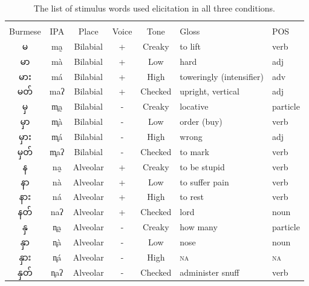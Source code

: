 \documentclass[12pt]{article}
\newcommand{\burm}[1]{{\fontspec[Script=Myanmar]{Padauk}#1}}
\newcommand{\ipa}[1]{{\fontspec{Times New Roman}#1}}
\begin{document}
\begin{table}[h!]
\centering
\caption*{The list of stimulus words used elicitation in all three conditions.}
\label{tab:words}
	\begin{tabular}{cccccll}
	\toprule\\
	Burmese & IPA  & Place    & Voice  & Tone    & Gloss                     & POS      \\
	\midrule
	\burm{မ  }     & \ipa{ma̰}  & Bilabial & +     & Creaky  & to lift                   & verb     \\
	\burm{မာ  }    & \ipa{mà}  & Bilabial & +     & Low     & hard                      & adj      \\
	\burm{မား }    & \ipa{má}  & Bilabial & +     & High    & toweringly (intensifier)  & adv      \\
	\burm{မတ် }    & \ipa{maʔ}  & Bilabial & +     & Checked & upright, vertical         & adj      \\
	\burm{မှ  }    & \ipa{m̥a̰} & Bilabial & -     & Creaky  & locative                  & particle \\
	\burm{မှာ }    & \ipa{m̥à} & Bilabial & -     & Low     & order (buy)               & verb     \\
	\burm{မှား}    & \ipa{m̥á} & Bilabial & -     & High    & wrong                     & adj      \\
	\burm{မှတ်}    & \ipa{m̥aʔ} & Bilabial & -     & Checked & to mark                   & verb     \\
	\burm{န   }    & \ipa{na̰}  & Alveolar & +     & Creaky  & to be stupid              & verb     \\
	\burm{နာ  }    & \ipa{nà}  & Alveolar & +     & Low     & to suffer pain            & verb     \\
	\burm{နား }    & \ipa{ná}  & Alveolar & +     & High    & to rest                   & verb     \\
	\burm{နတ် }    & \ipa{naʔ}  & Alveolar & +     & Checked & lord                      & noun     \\
	\burm{နှ  }    & \ipa{n̥a̰} & Alveolar & -     & Creaky  & how many                  & particle \\
	\burm{နှာ }    & \ipa{n̥à} & Alveolar & -     & Low     & nose                      & noun     \\
	\burm{နှား}    & \ipa{n̥á} & Alveolar & -     & High    & \textsc{na}                        & \textsc{na}       \\
	\burm{နှတ်}    & \ipa{n̥aʔ} & Alveolar & -     & Checked & administer snuff          & verb     \\

\end{tabular}
\end{table}
\end{document}
